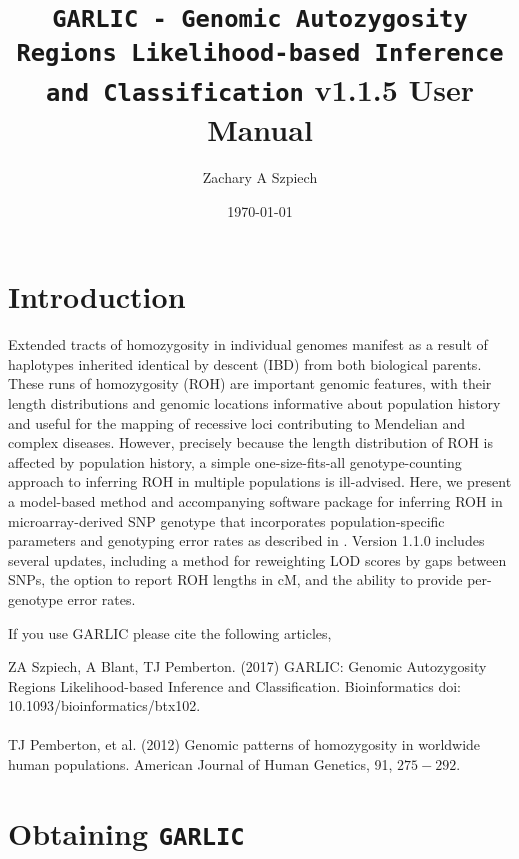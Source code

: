 \documentclass[12pt]{article}%
\title{{\tt GARLIC - Genomic Autozygosity Regions Likelihood-based Inference and Classification} v1.1.5 User Manual}
\date{\today}
\author{Zachary A Szpiech}
\begin{document}
\lstset{breaklines=true,basicstyle=\ttfamily}

\null  %
\nointerlineskip  %
\vfill
\let\snewpage \newpage
\let\newpage \relax
\maketitle
\thispagestyle{empty}
\let \newpage \snewpage
\vfill 
\break %

\tableofcontents 

\newpage

\section{Introduction}

Extended tracts of homozygosity in individual genomes manifest as a result of haplotypes inherited identical by descent (IBD) from both biological parents. These runs of homozygosity (ROH) are important genomic features, with their length distributions and genomic locations informative about population history and useful for the mapping of recessive loci contributing to Mendelian and complex diseases. However, precisely because the length distribution of ROH is affected by population history, a simple one-size-fits-all genotype-counting approach to inferring ROH in multiple populations is ill-advised. Here, we present a model-based method and accompanying software package for inferring ROH in microarray-derived SNP genotype that incorporates population-specific parameters and genotyping error rates as described in \cite{PembertonEtAl12:AJHG}. Version 1.1.0 includes several updates, including a method for reweighting LOD scores by gaps between SNPs, the option to report ROH lengths in cM, and the ability to provide per-genotype error rates.

If you use GARLIC please cite the following articles,

\noindent ZA Szpiech, A Blant, TJ Pemberton. (2017) GARLIC: Genomic Autozygosity Regions Likelihood-based Inference and Classification. Bioinformatics doi: 10.1093/bioinformatics/btx102.
\\\\
TJ Pemberton, et al. (2012) Genomic patterns of homozygosity in worldwide human populations. American Journal of Human Genetics, 91, $275-292$.

\section{Obtaining {\tt GARLIC}}
\end{document}
